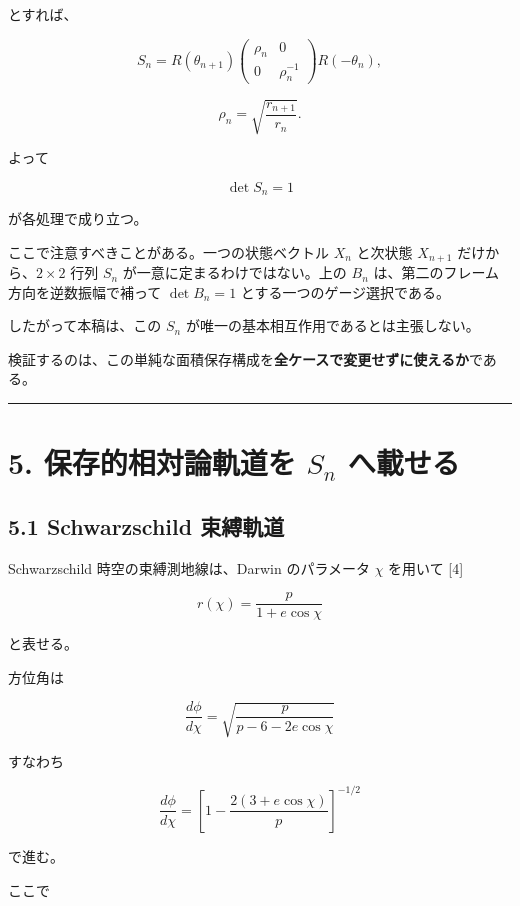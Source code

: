 \documentclass[
  a4paper,
]{ltjsarticle}
\begin{document}
とすれば、

\[
S_n
=
R(\theta_{n+1})
\begin{pmatrix}
\rho_n&0\\
0&\rho_n^{-1}
\end{pmatrix}
R(-\theta_n),
\]

\[
\rho_n=
\sqrt{\frac{r_{n+1}}{r_n}}.
\]

よって

\[
\boxed{\det S_n=1}
\]

が各処理で成り立つ。

ここで注意すべきことがある。一つの状態ベクトル \(X_n\) と次状態
\(X_{n+1}\) だけから、\(2\times2\) 行列 \(S_n\)
が一意に定まるわけではない。上の \(B_n\)
は、第二のフレーム方向を逆数振幅で補って \(\det B_n=1\)
とする一つのゲージ選択である。

したがって本稿は、この \(S_n\)
が唯一の基本相互作用であるとは主張しない。

検証するのは、この単純な面積保存構成を\textbf{全ケースで変更せずに使えるか}である。

\begin{center}\rule{0.5\linewidth}{0.5pt}\end{center}

\section{\texorpdfstring{5. 保存的相対論軌道を \(S_n\)
へ載せる}{5. 保存的相対論軌道を S\_n へ載せる}}\label{ux4fddux5b58ux7684ux76f8ux5bfeux8ad6ux8eccux9053ux3092-s_n-ux3078ux8f09ux305bux308b}

\subsection{5.1 Schwarzschild
束縛軌道}\label{schwarzschild-ux675fux7e1bux8eccux9053}

Schwarzschild 時空の束縛測地線は、Darwin のパラメータ \(\chi\) を用いて
{[}4{]}

\[
r(\chi)=\frac{p}{1+e\cos\chi}
\]

と表せる。

方位角は

\[
\frac{d\phi}{d\chi}
=
\sqrt{\frac{p}{p-6-2e\cos\chi}}
\]

すなわち

\[
\frac{d\phi}{d\chi}
=
\left[
1-\frac{2(3+e\cos\chi)}{p}
\right]^{-1/2}
\]

で進む。

ここで
\end{document}
